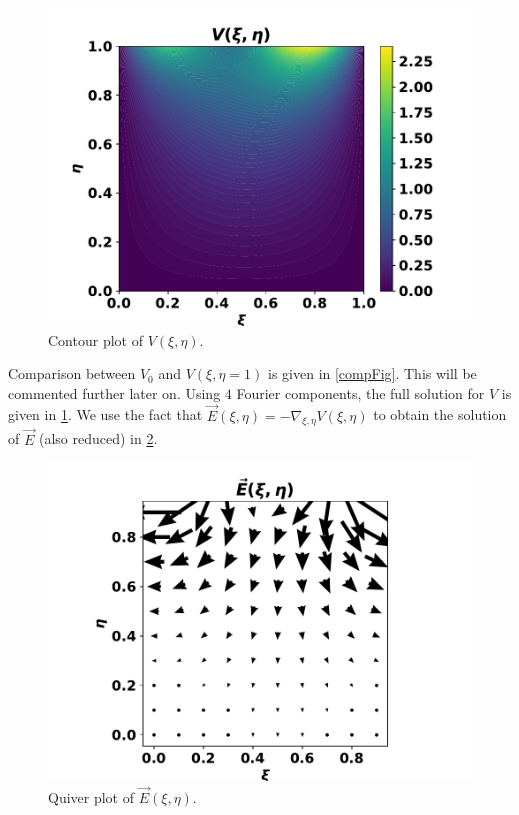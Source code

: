 \documentclass[11p, a4paper, english]{article}
\begin{document}
\begin{figure}[h!]
\centering
\includegraphics[scale=0.8]{plotVxy.pdf}
\caption{Contour plot of $V(\xi, \eta)$.}
\label{Vxy}
\end{figure}

Comparison between $V_{0}$ and $V(\xi, \eta=1)$ is given in \cref{compFig}. This will be commented further later on. Using $4$ Fourier components, the full solution for $V$ is given in \cref{Vxy}. We use the fact that $\vec{E}(\xi, \eta) = -\nabla_{\xi, \eta} V(\xi, \eta)$ to obtain the solution of $\vec{E}$ (also reduced) in \cref{Exy}.

\begin{figure}[h!]
\begin{center}
\includegraphics[scale=0.8]{plotExy.pdf}
\caption{Quiver plot of $\vec{E}(\xi, \eta)$.}
\end{center}
\label{Exy}
\end{figure}
\end{document}
